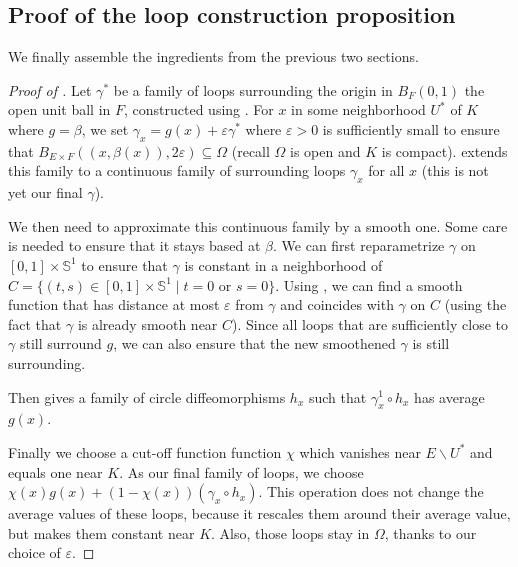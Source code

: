 \subsection{Proof of the loop construction proposition}
\label{sub:proof_of_the_loop_construction_proposition}

We finally assemble the ingredients from the previous two sections.

\begin{proof}[Proof of ]
  \leanok
  Let $γ^*$ be a family of loops surrounding the origin in $B_F(0,1)$
  the open unit ball in $F$, constructed using .
  For $x$ in some neighborhood $U^*$ of $K$ where $g = β$, we set
  $γ_x = g(x) + εγ^*$ where $ε > 0$ is sufficiently small to ensure that
  $B_{E\times F}((x,β(x)),2ε)\subseteq \Omega$ (recall $Ω$ is
  open and $K$ is compact).
   extends this family to a continuous
  family of surrounding loops $γ_x$ for all $x$ (this is not yet our
  final $γ$).

  We then need to approximate this continuous family by a smooth one.
  Some care is needed to ensure that it stays based at $β$.
  We can first reparametrize $γ$ on $[0,1] \times 𝕊^1$
  to ensure that $γ$ is constant in a neighborhood of
  $C = \{(t, s) \in [0,1] \times 𝕊^1 \mid t = 0 \text{ or } s = 0\}$.
  Using , we can find a smooth function
  that has distance at most $ε$ from $γ$ and coincides with $γ$ on $C$
  (using the fact that $γ$ is already smooth near $C$).
  Since all loops that are sufficiently close to $γ$ still surround $g$,
  we can also ensure that the new smoothened $γ$ is still surrounding.

  Then  gives a family of circle
  diffeomorphisms $h_x$ such that $γ^1_x ∘ h_x$ has average $g(x)$.

  Finally we choose a cut-off function function $χ$ which vanishes near
  $E ∖ U^*$ and equals one near $K$. As our final family of loops,
  we choose $χ(x)g(x) + (1-χ(x))(γ_x ∘ h_x)$. This
  operation does not change the average values of these loops, because
  it rescales them around their average value, but makes them constant
  near $K$. Also, those loops stay in $Ω$, thanks to our choice of $ε$.
\end{proof}

